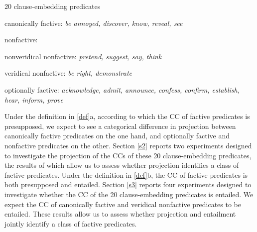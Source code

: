 \documentclass{language}
\newcommand{\6}{\mbox{$[\hspace*{-.6mm}[$}}
\newcommand{\9}{\mbox{$]\hspace*{-.6mm}]$}}
\begin{document}
\begin{exe}
\ex\label{pred} 20 clause-embedding predicates 

\begin{xlist}

\ex canonically factive: {\em be annoyed, discover, know, reveal, see}

\ex nonfactive:

\begin{xlist}

\ex nonveridical nonfactive: {\em pretend, suggest, say, think}

\ex veridical nonfactive: {\em be right, demonstrate}

\end{xlist}

\ex optionally factive: {\em acknowledge, admit, announce, confess, confirm, establish, hear, inform, prove}

\end{xlist}

\end{exe}
%
%
%

Under the definition in \ref{def}a, according to which the CC of factive predicates is presupposed, we expect to see a categorical difference in projection between canonically factive predicates on the one hand, and optionally factive and nonfactive predicates on the other. Section \ref{s2} reports two experiments designed to investigate the projection of the CCs of these 20 clause-embedding predicates, the results of which allow us to assess whether projection identifies a class of factive predicates. Under the definition in \ref{def}b, the CC of factive predicates is both presupposed and entailed. Section \ref{s3} reports four experiments designed to investigate whether the CC of the 20 clause-embedding predicates is entailed. We expect the CC of canonically factive and veridical nonfactive predicates to be entailed. These results allow us to assess whether projection and entailment jointly identify a class of factive predicates.
\end{document}
